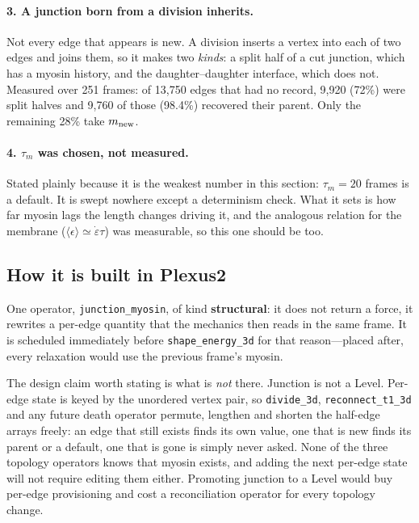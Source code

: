 \documentclass[10pt]{article}
\newcommand{\op}[1]{\texttt{#1}}
\begin{document}
\paragraph{3. A junction born from a division inherits.} Not every edge that appears is new. A division
inserts a vertex into each of two edges and joins them, so it makes two \emph{kinds}: a split half of a
cut junction, which has a myosin history, and the daughter--daughter interface, which does not. Measured
over 251 frames: of 13{,}750 edges that had no record, 9{,}920 (72\%) were split halves and 9{,}760 of
those (98.4\%) recovered their parent. Only the remaining 28\% take $m_{\rm new}$.

\paragraph{4. $\tau_m$ was chosen, not measured.} Stated plainly because it is the weakest number in
this section: $\tau_m=20$ frames is a default. It is swept nowhere except a determinism check. What it
sets is how far myosin lags the length changes driving it, and the analogous relation for the membrane
($\langle\epsilon\rangle\simeq\dot\varepsilon\tau$) was measurable, so this one should be too.

\subsection*{How it is built in Plexus2}

One operator, \op{junction\_myosin}, of kind \textbf{structural}: it does not return a force, it rewrites
a per-edge quantity that the mechanics then reads in the same frame. It is scheduled immediately before
\op{shape\_energy\_3d} for that reason---placed after, every relaxation would use the previous frame's
myosin.

The design claim worth stating is what is \emph{not} there. Junction is not a Level. Per-edge state is
keyed by the unordered vertex pair, so \op{divide\_3d}, \op{reconnect\_t1\_3d} and any future death
operator permute, lengthen and shorten the half-edge arrays freely: an edge that still exists finds its
own value, one that is new finds its parent or a default, one that is gone is simply never asked. None
of the three topology operators knows that myosin exists, and adding the next per-edge state will not
require editing them either. Promoting junction to a Level would buy per-edge provisioning and cost a
reconciliation operator for every topology change.
\end{document}
